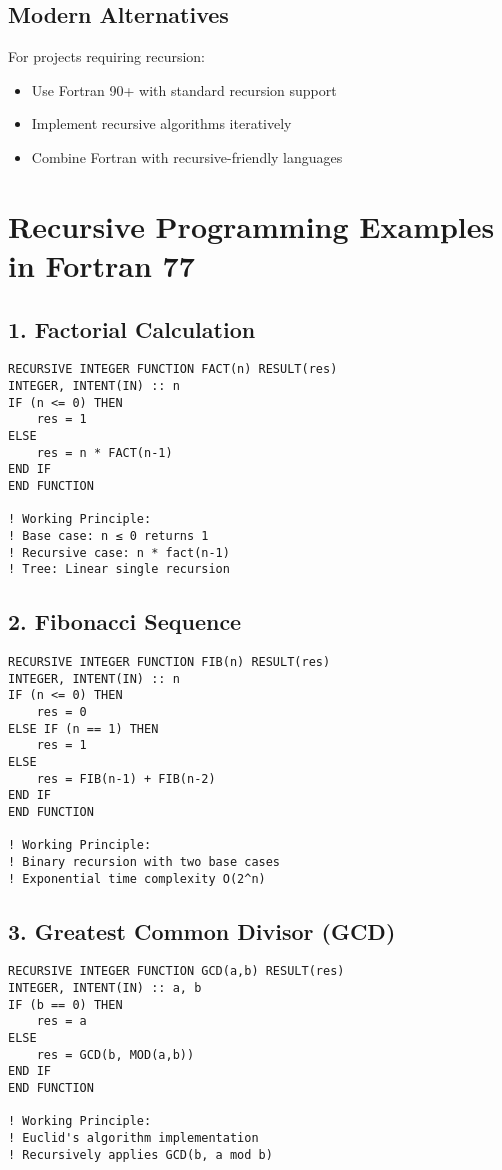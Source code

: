 \documentclass{book}
\begin{document}
\subsection*{Modern Alternatives}
For projects requiring recursion:
\begin{itemize}
\item Use Fortran 90+ with standard recursion support
\item Implement recursive algorithms iteratively
\item Combine Fortran with recursive-friendly languages
\end{itemize}

\section{Recursive Programming Examples in Fortran 77}

\subsection*{1. Factorial Calculation}
\begin{verbatim}
RECURSIVE INTEGER FUNCTION FACT(n) RESULT(res)
INTEGER, INTENT(IN) :: n
IF (n <= 0) THEN
    res = 1
ELSE
    res = n * FACT(n-1)
END IF
END FUNCTION

! Working Principle:
! Base case: n ≤ 0 returns 1
! Recursive case: n * fact(n-1)
! Tree: Linear single recursion
\end{verbatim}

\subsection*{2. Fibonacci Sequence}
\begin{verbatim}
RECURSIVE INTEGER FUNCTION FIB(n) RESULT(res)
INTEGER, INTENT(IN) :: n
IF (n <= 0) THEN
    res = 0
ELSE IF (n == 1) THEN
    res = 1
ELSE
    res = FIB(n-1) + FIB(n-2)
END IF
END FUNCTION

! Working Principle:
! Binary recursion with two base cases
! Exponential time complexity O(2^n)
\end{verbatim}

\subsection*{3. Greatest Common Divisor (GCD)}
\begin{verbatim}
RECURSIVE INTEGER FUNCTION GCD(a,b) RESULT(res)
INTEGER, INTENT(IN) :: a, b
IF (b == 0) THEN
    res = a
ELSE
    res = GCD(b, MOD(a,b))
END IF
END FUNCTION

! Working Principle:
! Euclid's algorithm implementation
! Recursively applies GCD(b, a mod b)
\end{verbatim}
\end{document}
